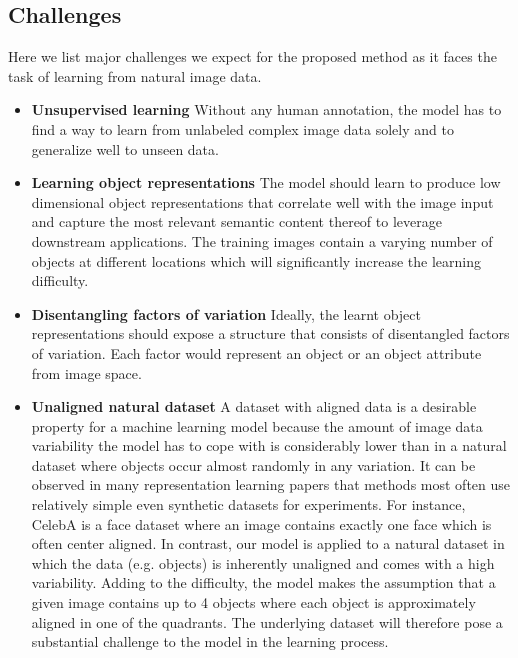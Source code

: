 \documentclass[12pt,a4paper]{article}
\begin{document}
\subsection{Challenges}
Here we list major challenges we expect for the proposed method as it faces the task of learning from natural image data.
\begin{itemize}
  \item \textbf{Unsupervised learning} Without any human annotation, the model has to find a way to learn from unlabeled complex image data solely and to generalize well to unseen data.
  \item \textbf{Learning object representations} The model should learn to produce low dimensional object representations that correlate well with the image input and capture the most relevant semantic content thereof to leverage downstream applications. The training images contain a varying number of objects at different locations which will significantly increase the learning difficulty.
  \item \textbf{Disentangling factors of variation} Ideally, the learnt object representations should expose a structure that consists of disentangled factors of variation. Each factor would represent an object or an object attribute from image space.
  \item \textbf{Unaligned natural dataset} A dataset with aligned data is a desirable property for a machine learning model because the amount of image data variability the model has to cope with is considerably lower than in a natural dataset where objects occur almost randomly in any variation. It can be observed in many representation learning papers that methods most often use relatively simple even synthetic datasets for experiments. For instance, CelebA is a face dataset where an image contains exactly one face which is often center aligned. In contrast, our model is applied to a natural dataset in which the data (e.g. objects) is inherently unaligned and comes with a high variability. Adding to the difficulty, the model makes the assumption that a given image contains up to 4 objects where each object is approximately aligned in one of the quadrants. The underlying dataset will therefore pose a substantial challenge to the model in the learning process.
\end{itemize}


\newpage
\end{document}
